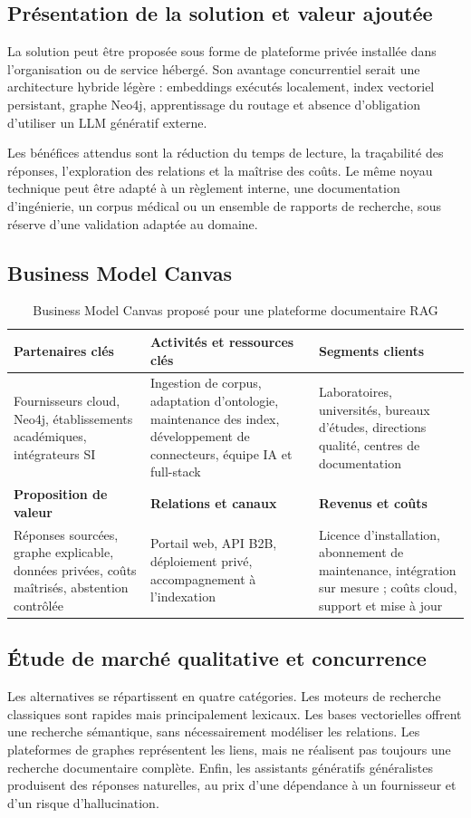 \documentclass[12pt,a4paper,oneside]{report}
\begin{document}
\subsection{Présentation de la solution et valeur ajoutée}
La solution peut être proposée sous forme de plateforme privée installée dans l'organisation ou de service hébergé. Son avantage concurrentiel serait une architecture hybride légère : embeddings exécutés localement, index vectoriel persistant, graphe Neo4j, apprentissage du routage et absence d'obligation d'utiliser un LLM génératif externe.

Les bénéfices attendus sont la réduction du temps de lecture, la traçabilité des réponses, l'exploration des relations et la maîtrise des coûts. Le même noyau technique peut être adapté à un règlement interne, une documentation d'ingénierie, un corpus médical ou un ensemble de rapports de recherche, sous réserve d'une validation adaptée au domaine.

\subsection{Business Model Canvas}
\begin{table}[H]
\centering
\small
\caption{Business Model Canvas proposé pour une plateforme documentaire RAG}
\begin{tabularx}{\textwidth}{|p{}|X|p{}|}
\hline
\textbf{Partenaires clés} & \textbf{Activités et ressources clés} & \textbf{Segments clients}\\
\hline
Fournisseurs cloud, Neo4j, établissements académiques, intégrateurs SI & Ingestion de corpus, adaptation d'ontologie, maintenance des index, développement de connecteurs, équipe IA et full-stack & Laboratoires, universités, bureaux d'études, directions qualité, centres de documentation\\
\hline
\textbf{Proposition de valeur} & \textbf{Relations et canaux} & \textbf{Revenus et coûts}\\
\hline
Réponses sourcées, graphe explicable, données privées, coûts maîtrisés, abstention contrôlée & Portail web, API B2B, déploiement privé, accompagnement à l'indexation & Licence d'installation, abonnement de maintenance, intégration sur mesure ; coûts cloud, support et mise à jour\\
\hline
\end{tabularx}
\end{table}

\subsection{Étude de marché qualitative et concurrence}
Les alternatives se répartissent en quatre catégories. Les moteurs de recherche classiques sont rapides mais principalement lexicaux. Les bases vectorielles offrent une recherche sémantique, sans nécessairement modéliser les relations. Les plateformes de graphes représentent les liens, mais ne réalisent pas toujours une recherche documentaire complète. Enfin, les assistants génératifs généralistes produisent des réponses naturelles, au prix d'une dépendance à un fournisseur et d'un risque d'hallucination.
\end{document}
